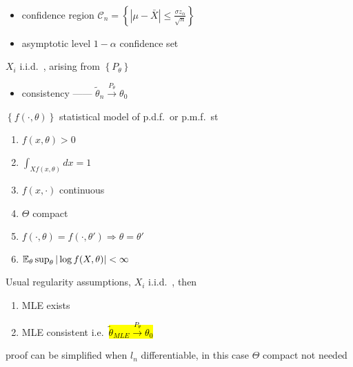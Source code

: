 \begin{example}\,
    \begin{itemize}
        \item confidence region $\mathcal{C}_n = \left\{ |\mu - \bar{X}| \leq \frac{\sigma z_\alpha}{\sqrt{n}} \right\}$
        \item asymptotic level $1 - \alpha$ confidence set
    \end{itemize}
\end{example}

\begin{setting}
    $X_i$ i.i.d.\ , arising from $\left\{ P_\theta \right\}$
\end{setting}

\begin{itemize}
    \item consistency ------ $\tilde \theta_n \xrightarrow{P_\theta} \theta_0$
\end{itemize}

\begin{assumption}
    $\left\{ f(\cdot, \theta) \right\}$ statistical model of p.d.f.\  or p.m.f.\ st
    \begin{enumerate}
        \item $f(x, \theta) > 0$
        \item $\int_{Xf(x, \theta)}dx = 1$
        \item $f(x, \cdot)$ continuous
        \item $\Theta$ compact
        \item $f(\cdot, \theta) = f(\cdot, \theta') \Rightarrow \theta = \theta'$
        \item $\mathbb{E}_{\theta}\sup_{\theta}|\log f(X, \theta)| < \infty$
    \end{enumerate}
\end{assumption}

\begin{thm}
    Usual regularity assumptions, $X_i$ i.i.d.\ , then
    \begin{enumerate}
        \item MLE exists
        \item MLE consistent i.e.\ \hl{$\tilde \theta_{MLE} \xrightarrow{P_{\theta}} \theta_0$}
    \end{enumerate}
\end{thm}

\begin{fact}
    proof can be simplified when $l_n$ differentiable, in this case $\Theta$ compact not needed
\end{fact}

